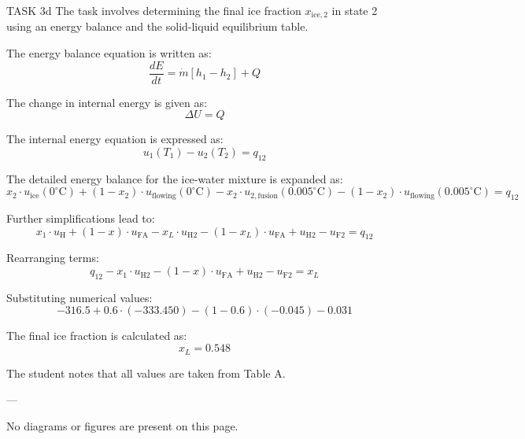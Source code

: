 TASK 3d  
The task involves determining the final ice fraction \( x_{\text{ice},2} \) in state 2 using an energy balance and the solid-liquid equilibrium table.

The energy balance equation is written as:  
\[
\frac{dE}{dt} = \dot{m} \left[ h_1 - h_2 \right] + Q
\]

The change in internal energy is given as:  
\[
\Delta U = Q
\]

The internal energy equation is expressed as:  
\[
u_1(T_1) - u_2(T_2) = q_{12}
\]

The detailed energy balance for the ice-water mixture is expanded as:  
\[
x_2 \cdot u_{\text{ice}}(0^\circ\text{C}) + (1 - x_2) \cdot u_{\text{flowing}}(0^\circ\text{C}) - x_2 \cdot u_{2,\text{fusion}}(0.005^\circ\text{C}) - (1 - x_2) \cdot u_{\text{flowing}}(0.005^\circ\text{C}) = q_{12}
\]

Further simplifications lead to:  
\[
x_1 \cdot u_{\text{H}} + (1 - x) \cdot u_{\text{FA}} - x_L \cdot u_{\text{H2}} - (1 - x_L) \cdot u_{\text{FA}} + u_{\text{H2}} - u_{\text{F2}} = q_{12}
\]

Rearranging terms:  
\[
q_{12} - x_1 \cdot u_{\text{H2}} - (1 - x) \cdot u_{\text{FA}} + u_{\text{H2}} - u_{\text{F2}} = x_L
\]

Substituting numerical values:  
\[
-316.5 + 0.6 \cdot (-333.450) - (1 - 0.6) \cdot (-0.045) - 0.031
\]

The final ice fraction is calculated as:  
\[
x_L = 0.548
\]

The student notes that all values are taken from Table A.

---

No diagrams or figures are present on this page.